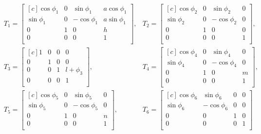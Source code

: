 \documentclass[onecolumn,10pt]{jhwhw}
\begin{document}
\begin{align*}
& T_1=
\begin{bmatrix*}[c]
\cos \phi_1 &  0 &  \sin \phi_1 & a \cos \phi_1 \\
\sin \phi_1 &  0 & -\cos \phi_1 & a \sin \phi_1 \\
          0 &  1 &          0 &           h \\
          0 &  0 &          0 &           1 \\
\end{bmatrix*},
& T_2=
\begin{bmatrix*}[c]
\cos \phi_2 & 0 &  \sin \phi_2 & 0 \\
\sin \phi_2 & 0 & -\cos \phi_2 & 0 \\
        0 & 1 &          0 & 0 \\
        0 & 0 &          0 & 1 \\
\end{bmatrix*}, \\
& T_3=
\begin{bmatrix*}[c]
1 & 0 & 0 &         0 \\
0 & 1 & 0 &         0 \\
0 & 0 & 1 & l + \phi_3\\
0 & 0 & 0 &         1 \\
\end{bmatrix*},
& T_4=
\begin{bmatrix*}[c]
\cos \phi_4 & 0 &  \sin \phi_4 & 0 \\
\sin \phi_4 & 0 & -\cos \phi_4 & 0 \\
        0 & 1 &          0 & m \\
        0 & 0 &          0 & 1 \\
\end{bmatrix*}, \\
& T_5=
\begin{bmatrix*}[c]
\cos \phi_5 &  0 &  \sin \phi_5 & 0 \\
\sin \phi_5 &  0 & -\cos \phi_5 & 0 \\
        0 &  1 &          0 & n \\
        0 &  0 &          0 & 1 \\
\end{bmatrix*},
& T_6=
\begin{bmatrix*}[c]
\cos \phi_6 &  \sin \phi_6 & 0 &  0 \\
\sin \phi_6 & -\cos \phi_6 & 0 &  0 \\
          0 &            0 & 1 &  0 \\
          0 &            0 & 0 &  1 \\
\end{bmatrix*}
\end{align*}
\end{document}
